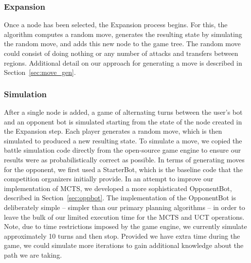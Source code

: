 \documentclass[a4paper,11pt]{article}
\begin{document}
\subsubsection{Expansion}
Once a node has been selected, the Expansion process begins. For this, 
the algorithm computes a random move, generates the resulting state by simulating the random move, 
and adds this new node to the game tree. The random move could consist of doing nothing or any 
number of attacks and transfers between regions.  Additional detail on our approach for generating
a move is described in Section~\ref{sec:move_gen}.

\subsubsection{Simulation}
After a single node is added, a game of alternating turns between the user's bot and an 
opponent bot is simulated starting from the state of the node created in the Expansion step.  
Each player generates a random move, which is then simulated to produced a new resulting state.
To simulate a move, we copied the battle simulation code directly from the open-source game engine
to ensure our results were as probabilistically correct as possible. In terms of generating moves
for the opponent, we first used a StarterBot, which is the baseline code that the competition 
organizers initially provide.  In an attempt to improve our implementation of MCTS, we developed 
a more sophisticated OpponentBot, described in Section~\ref{sec:oppbot}.  The implementation of the
OpponentBot is deliberately simple -- simpler than our primary planning algorithms -- in order to 
leave the bulk of our limited execution time for the MCTS and UCT operations.  Note, due to time 
restrictions imposed by the game engine, we currently simulate approximately 10 turns and then stop.  
Provided we have extra time during the game, we could simulate more iterations to gain additional
 knowledge about the path we are taking.
\end{document}
